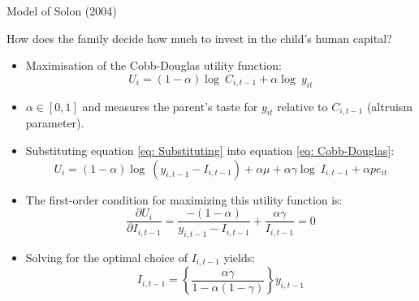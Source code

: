 \documentclass{beamer}
\begin{document}
\begin{frame}{Model of Solon (2004)}
\begin{block}{\small How does the family decide how much to invest in the child’s human capital?}
\end{block}
\begin{itemize}
\item \footnotesize Maximisation of the Cobb-Douglas utility function:
\begin{equation} \label{eq: Cobb-Douglas} 
U_i=(1-\alpha) \log \ C_{i,t-1}+ \alpha \log \ y_{it}
\end{equation}

\item \tiny $\alpha \in [0,1]$ and measures the parent’s taste for $y_{it}$ relative to $C_{i,t-1}$ (altruism parameter).

\item \footnotesize Substituting equation \eqref{eq: Substituting} into equation \eqref{eq: Cobb-Douglas}:
\begin{equation} \label{eq: rewritten} 
U_i = (1 - \alpha) \log \ (y_{i,t-1}-I_{i,t-1})+ \alpha \mu + \alpha \gamma \log \ I_{i,t-1} + \alpha pe_{it}
\end{equation}


\item \footnotesize The first-order condition for maximizing this utility function is:
\begin{equation} \label{eq: First-order} 
\frac{\partial U_i}{\partial I_{i,t-1}} = \frac{-(1-\alpha)}{y_{i,t-1}-I_{i,t-1}} + \frac{\alpha \gamma}{I_{i,t-1}}=0
\end{equation}

\item \footnotesize Solving for the optimal choice of $I_{i,t-1}$ yields:
\begin{equation} \label{eq: Optimal-choice} 
I_{i,t-1} = \left \{ \frac{\alpha \gamma}{1 - \alpha (1 - \gamma)} \right \} y_{i,t-1}
\end{equation}
\end{itemize}

\flushright \hyperlink{main}{\beamerbutton{\textcolor{red}{Back to Presentation}}}
\end{frame}
\end{document}
